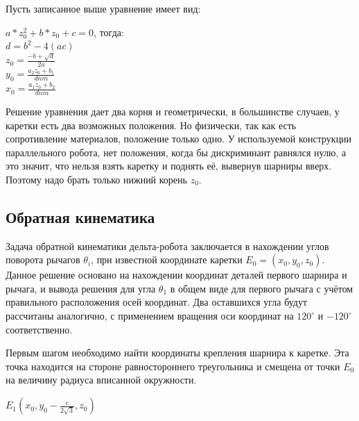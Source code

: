 Пусть записанное выше уравнение имеет вид:

\begin{center}

    $a*z^{2}_{0} + b*z_{0} + c = 0 $, тогда:\\
    \vspace{0.5cm}
    $d = b^{2} - 4(ac)$\\
    \vspace{0.5cm}
    $z_{0} = \frac{-b  + \sqrt{d}} {2a} $\\
    \vspace{0.5cm}
    $y_{0} = \frac{a_{2}z_{0} + b_{1}} {dnm}$\\
    \vspace{0.5cm}
    $x_{0} = \frac{a_{1}z_{0} + b_{2}} {dnm}$\\
\end{center}

Решение уравнения дает два корня и геометрически, в большинстве случаев, у каретки есть два возможных положения. Но физически, так как есть сопротивление материалов, положение только одно. У используемой конструкции параллельного робота, нет положения, когда бы дискриминант равнялся нулю, а это значит, что нельзя взять каретку и поднять её, вывернув шарниры вверх. Поэтому надо брать только нижний корень $z_{0}$.      

\subsection{Обратная кинематика}

Задача обратной кинематики дельта-робота заключается в нахождении углов поворота рычагов $\theta_{i}$, при известной координате каретки $E_{0}=(x_{0},y_{0},z_{0})$. Данное решение основано на нахождении координат деталей первого шарнира и рычага, и вывода решения для угла $\theta_{1}$ в общем виде для первого рычага с учётом правильного расположения осей координат. Два оставшихся угла будут рассчитаны аналогично, с применением вращения оси координат на $120^{\circ}$ и $-120^{\circ}$ соответственно.

Первым шагом необходимо найти координаты крепления шарнира к каретке. Эта точка находится на стороне равностороннего треугольника и смещена от точки $E_{0}$ на величину радиуса вписанной окружности.

\begin{center}
$E_{1} (x_{0},y_{0}-\frac{e}{2\sqrt{3}},z_{0})$
\end{center}

